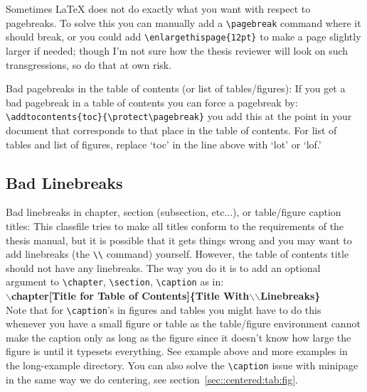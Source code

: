 Sometimes LaTeX does not do exactly what you want with respect to
pagebreaks.  To solve this you can manually add a \verb+\pagebreak+
command where it should break, or you could add
\verb+\enlargethispage{12pt}+ to make a page slightly larger if
needed; though I'm not sure how the thesis reviewer will look on such
transgressions, so do that at own risk.

Bad pagebreaks in the table of contents (or list of tables/figures):
If you get a bad pagebreak in a table of contents you can force a
pagebreak by: \verb+\addtocontents{toc}{\protect\pagebreak}+ you add
this at the point in your document that corresponds to that place in
the table of contents.  For list of tables and list of figures,
replace `toc' in the line above with `lot' or `lof.'


\subsection{Bad Linebreaks}

Bad linebreaks in chapter, section (subsection, etc...), or
table/figure caption titles: This classfile tries to make all titles
conform to the requirements of the thesis manual, but it is possible
that it gets things wrong and you may want to add linebreaks (the
\verb+\\+ command) yourself.  However, the table of contents title
should not have any linebreaks.  The way you do it is to add an
optional argument to \verb+\chapter+, \verb+\section+,
\verb+\caption+ as in:\\
\hspace*{2em}\textbf{$\backslash$chapter[Title for Table of
  Contents]\{Title With$\backslash$$\backslash$Linebreaks\}}\\
Note that for \verb+\caption+'s in figures and tables you might have
to do this whenever you have a small figure or table as the
table/figure environment cannot make the caption only as long as the
figure since it doesn't know how large the figure is until it typesets
everything.  See example above and more examples in the long-example
directory.  You can also solve the \verb+\caption+ issue with minipage
in the same way we do centering, see
section~\ref{sec::centered:tab:fig}.



